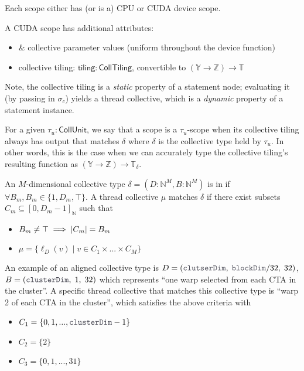 Each scope either has (or is a) CPU or CUDA device scope.

\filbreak
A CUDA scope has additional attributes:
\begin{itemize}
  \item {} \&  collective parameter values (uniform throughout the device function)
  \item collective tiling: $\mathsf{tiling}: \mathsf{CollTiling}$, convertible to $(\mathbb{Y} \to \mathbb{Z}) \to \mathbb{T}$
\end{itemize}

\filbreak
Note, the collective tiling is a \textit{static} property of a statement node; evaluating it (by passing in $\sigma_c$) yields a thread collective, which is a \textit{dynamic} property of a statement instance.

\filbreak
For a given $\tau_u : \mathsf{CollUnit}$, we say that a scope is a $\tau_u$-scope when its collective tiling always has output that matches $\delta$ where $\delta$ is the collective type held by $\tau_u$.
In other words, this is the case when we can accurately type the collective tiling's resulting function as $(\mathbb{Y} \to \mathbb{Z}) \to \mathbb{T}_\delta$.

\filbreak
{}

An $M$-dimensional collective type $\delta = (D: \mathbb{N}^M, B: \mathbb{N}^M)$ is in  if $\forall B_m, B_m \in \{1, D_m, \top\}$.
A thread collective $\mu$ matches $\delta$ if there exist subsets $C_m \subseteq [0, D_m - 1]_\mathbb{N}$ such that
\begin{itemize}
  \item $B_m \ne \top \implies \left \vert C_m \right\vert = B_m$
  \item $\mu = \{ \ell_D(v) \mid v \in C_1 \times ... \times C_M \}$
\end{itemize}

An example of an aligned collective type is $D = (\lighttt{clutserDim},\;\lighttt{blockDim} / 32,\;32)$, $B = (\lighttt{clusterDim},\;1,\;32)$ which represents ``one warp selected from each CTA in the cluster''.
A specific thread collective that matches this collective type is ``warp 2 of each CTA in the cluster'', which satisfies the above criteria with
\begin{itemize}
  \item $C_1 = \{ 0, 1, ..., \lighttt{clusterDim}-1 \}$
  \item $C_2 = \{ 2 \}$
  \item $C_3 = \{ 0, 1, ..., 31 \}$
\end{itemize}

